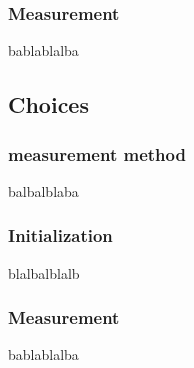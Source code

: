 \subsubsection{Measurement}
bablablalba
\subsection{Choices}
\subsubsection{measurement method}
balbalblaba
\subsubsection{Initialization}
blalbalblalb
\subsubsection{Measurement}
bablablalba
\newpage
